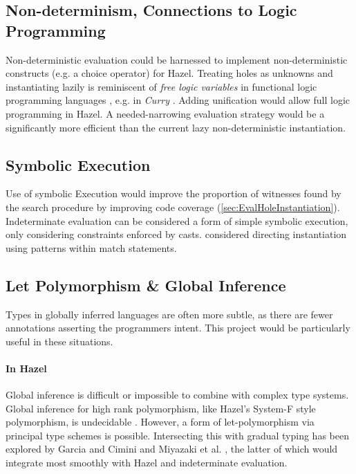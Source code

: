 \subsection{Non-determinism, Connections to Logic Programming}
\label{sec:LogicProgramming}
Non-deterministic evaluation could be harnessed to implement non-deterministic constructs (e.g. a choice operator) for Hazel. Treating holes as unknowns and instantiating lazily is reminiscent of \textit{free logic variables} in functional logic programming languages \cite{FunctionalLogicProgramming}, e.g. in \textit{Curry} \cite{CurryLang}. Adding unification \cite{UnificationSurvey} would allow full logic programming in Hazel. A needed-narrowing evaluation strategy \cite{NeededNarrowing} would be a significantly more efficient than the current lazy non-deterministic instantiation.

\subsection{Symbolic Execution}
Use of symbolic Execution \cite{SymbolicExecutionSurvey} would improve the proportion of witnesses found by the search procedure by improving code coverage (\cref{sec:EvalHoleInstantiation}). Indeterminate evaluation can be considered a form of simple {symbolic execution}, only considering constraints enforced by casts.  considered directing instantiation using patterns within match statements. 

\subsection{Let Polymorphism \& Global Inference}
Types in globally inferred languages are often more subtle, as there are fewer annotations asserting the programmers intent. This project would be particularly useful in these situations.

\paragraph{In Hazel}
Global inference is difficult or impossible to combine with complex type systems. Global inference for high rank polymorphism, like Hazel's System-F style polymorphism, is undecidable \cite{SystemFUndecidable}.  However, a form of let-polymorphism via principal type schemes \cite{PrincipleTypeSchemes} is possible. Intersecting this with gradual typing has been explored by Garcia and Cimini \cite{GradualTI} and Miyazaki et al. \cite{DTI}, the latter of which would integrate most smoothly with Hazel and indeterminate evaluation.

